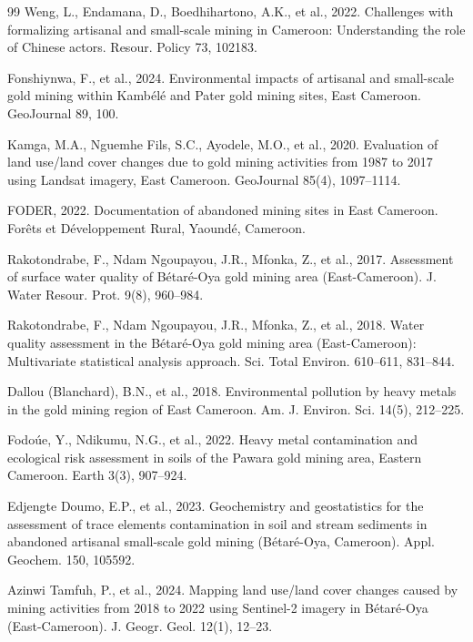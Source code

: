 \documentclass[preprint,12pt,authoryear]{elsarticle}
\begin{document}
\begin{thebibliography}{99}
Weng, L., Endamana, D., Boedhihartono, A.K., et al., 2022. Challenges with formalizing artisanal and small-scale mining in Cameroon: Understanding the role of Chinese actors. Resour. Policy 73, 102183.

Fonshiynwa, F., et al., 2024. Environmental impacts of artisanal and small-scale gold mining within Kamb\'{e}l\'{e} and Pater gold mining sites, East Cameroon. GeoJournal 89, 100.

Kamga, M.A., Nguemhe Fils, S.C., Ayodele, M.O., et al., 2020. Evaluation of land use/land cover changes due to gold mining activities from 1987 to 2017 using Landsat imagery, East Cameroon. GeoJournal 85(4), 1097--1114.

FODER, 2022. Documentation of abandoned mining sites in East Cameroon. For\^{e}ts et D\'{e}veloppement Rural, Yaound\'{e}, Cameroon.

Rakotondrabe, F., Ndam Ngoupayou, J.R., Mfonka, Z., et al., 2017. Assessment of surface water quality of B\'{e}tar\'{e}-Oya gold mining area (East-Cameroon). J. Water Resour. Prot. 9(8), 960--984.

Rakotondrabe, F., Ndam Ngoupayou, J.R., Mfonka, Z., et al., 2018. Water quality assessment in the B\'{e}tar\'{e}-Oya gold mining area (East-Cameroon): Multivariate statistical analysis approach. Sci. Total Environ. 610--611, 831--844.

Dallou (Blanchard), B.N., et al., 2018. Environmental pollution by heavy metals in the gold mining region of East Cameroon. Am. J. Environ. Sci. 14(5), 212--225.

Fodo\'{u}e, Y., Ndikumu, N.G., et al., 2022. Heavy metal contamination and ecological risk assessment in soils of the Pawara gold mining area, Eastern Cameroon. Earth 3(3), 907--924.

Edjengte Doumo, E.P., et al., 2023. Geochemistry and geostatistics for the assessment of trace elements contamination in soil and stream sediments in abandoned artisanal small-scale gold mining (B\'{e}tar\'{e}-Oya, Cameroon). Appl. Geochem. 150, 105592.

Azinwi Tamfuh, P., et al., 2024. Mapping land use/land cover changes caused by mining activities from 2018 to 2022 using Sentinel-2 imagery in B\'{e}tar\'{e}-Oya (East-Cameroon). J. Geogr. Geol. 12(1), 12--23.


\end{thebibliography}
\end{document}
